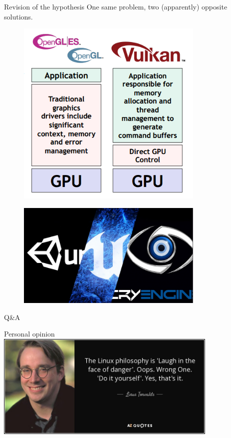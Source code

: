 \documentclass{beamer}
\begin{document}
\begin{frame}{Revision of the hypothesis}
  One same problem, two (apparently) opposite solutions.
  \vfill
  \begin{minipage}{0.45\textwidth}
    \centering
    \begin{figure}[h]
      \includegraphics[width=0.8\textwidth]{img/vulkan_info}
    \end{figure}
  \end{minipage}
  \begin{minipage}{0.45\textwidth}
    \centering
    \begin{figure}[h]
      \includegraphics[width=0.8\textwidth]{img/engines}
    \end{figure}
    \end{minipage}
\end{frame}
\begin{frame}{Q\&A}
\end{frame}
\begin{frame}{Personal opinion}
  \centering
  \includegraphics[width=0.8\textwidth]{img/linus}
\end{frame}
\end{document}
